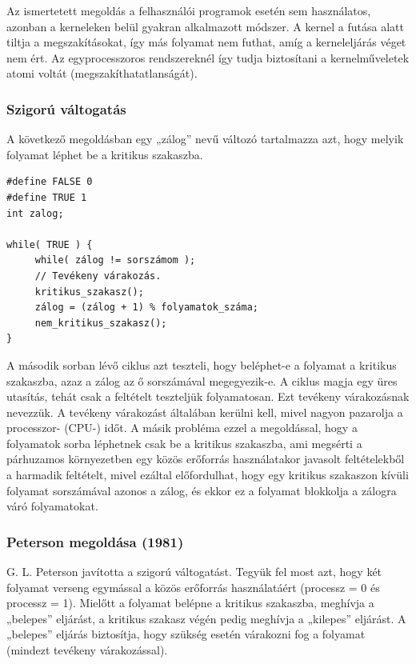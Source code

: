 \documentclass[tikz,12pt,margin=0px]{article}
\begin{document}
    \noindent Az ismertetett megoldás a felhasználói programok esetén sem használatos, azonban a kerneleken belül gyakran alkalmazott módszer. A kernel a futása alatt tiltja a megszakításokat, így más folyamat nem futhat, amíg a kerneleljárás véget nem ért. Az egyprocesszoros rendszereknél így tudja biztosítani a kernelműveletek atomi voltát (megszakíthatatlanságát).\\

    \subsubsection*{Szigorú váltogatás}

    A következő megoldásban egy „zálog” nevű változó tartalmazza azt, hogy melyik folyamat léphet be a kritikus szakaszba.

\newpage
   \begin{verbatim}
#define FALSE 0
#define TRUE 1
int zalog;

while( TRUE ) {
     while( zálog != sorszámom );
     // Tevékeny várakozás.
     kritikus_szakasz();
     zálog = (zálog + 1) % folyamatok_száma;
     nem_kritikus_szakasz();
}\end{verbatim}

    \noindent A második sorban lévő ciklus azt teszteli, hogy beléphet-e a folyamat a kritikus szakaszba, azaz a zálog az ő sorszámával megegyezik-e. A ciklus magja egy üres utasítás, tehát csak a feltételt teszteljük folyamatosan. Ezt tevékeny várakozásnak nevezzük. A tevékeny várakozást általában kerülni kell, mivel nagyon pazarolja a processzor- (CPU-) időt. A másik probléma ezzel a megoldással, hogy a folyamatok sorba léphetnek csak be a kritikus szakaszba, ami megsérti a párhuzamos környezetben egy közös erőforrás használatakor javasolt feltételekből a harmadik feltételt, mivel ezáltal előfordulhat, hogy egy kritikus szakaszon kívüli folyamat sorszámával azonos a zálog, és ekkor ez a folyamat blokkolja a zálogra váró folyamatokat.\\

    \subsubsection*{Peterson megoldása (1981)}

    G. L. Peterson javította a szigorú váltogatást. Tegyük fel most azt, hogy két folyamat verseng egymással a közös erőforrás használatáért (processz = 0 és processz = 1). Mielőtt a folyamat belépne a kritikus szakaszba, meghívja a „belepes” eljárást, a kritikus szakasz végén pedig meghívja a „kilepes” eljárást. A „belepes” eljárás biztosítja, hogy szükség esetén várakozni fog a folyamat (mindezt tevékeny várakozással).
\end{document}

